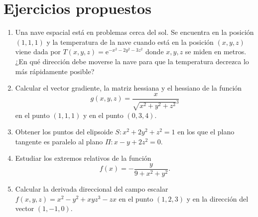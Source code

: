 \section{Ejercicios propuestos}
\begin{enumerate}[leftmargin=*]
\item Una nave espacial está en problemas cerca del sol. 
Se encuentra en la posición $(1,1,1)$ y la temperatura de la nave cuando está en la posición $(x,y,z)$ viene dada por
$T(x,y,z)=\mbox{e}^{-x^2-2y^2-3z^2}$ donde $x,y,z$ se miden en metros.
¿En qué dirección debe moverse la nave para que la temperatura decrezca lo más rápidamente posible?

\item Calcular el vector gradiente, la matriz hessiana y el hessiano de la función
\[
g(x,y,z) = \frac{x}{\sqrt{x^2+y^2+z^2}^3}
\]
en el punto $(1,1,1)$ y en el punto $(0,3,4)$. 

\item Obtener los puntos del elipsoide $S: x^2+2y^2+z^2=1$ en los que el plano tangente es paralelo al plano $\Pi:
x-y+2z^2=0$.

\item Estudiar los extremos relativos de la función 
\[
f(x)=-\frac{y}{9+x^2+y^2}.
\]

\item Calcular la derivada direccional del campo escalar $f(x,y,z)=x^2-y^2+xyz^3-zx$ en el punto $(1,2,3)$ y en la
dirección del vector $(1,-1,0)$.
\end{enumerate}
